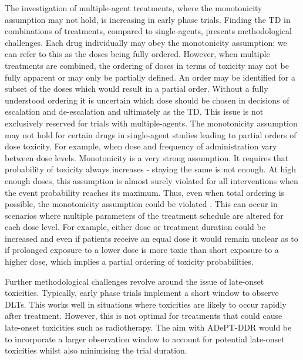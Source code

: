 The investigation of multiple-agent treatments, where the monotonicity assumption may not hold, is increasing in early phase trials. Finding the TD in combinations of treatments, compared to single-agents,  presents methodological challenges. Each drug individually may obey the monotonicity assumption; we can refer to this as the doses being fully ordered. However, when multiple treatments are combined, the ordering of doses in terms of toxicity may not be fully apparent or may only be partially defined. An order may be identified for a subset of the doses which would result in a partial order. Without a fully understood ordering it is uncertain which dose should be chosen in decisions of escalation and de-escalation and ultimately as the TD. This issue is not exclusively reserved for trials with multiple-agents. The monotonicity assumption may not hold for certain drugs in single-agent studies leading to partial orders of dose toxicity. For example, when dose and frequency of administration vary between dose levels. Monotonicity is a very strong assumption. It requires that probability of toxicity always increases - staying the same is not enough. At high enough doses, this assumption is almost surely violated for all interventions when the event probability reaches its maximum. Thus, even when total ordering is possible, the monotonicity assumption could be violated \cite{brockMoreBetterAnalysis2021}. This can occur in scenarios where multiple parameters of the treatment schedule are altered for each dose level. For example, either dose or treatment duration could be increased and even if patients receive an equal dose it would remain unclear as to if prolonged exposure to a lower dose is more toxic than short exposure to a higher dose, which implies a partial ordering of toxicity probabilities. 

Further methodological challenges revolve around the issue of late-onset toxicities. Typically, early phase trials implement a short window to observe DLTs. This works well in situations where toxicities are likely to occur rapidly after treatment. However, this is not optimal for treatments that could cause late-onset toxicities such as radiotherapy. The aim with ADePT-DDR would be to incorporate a larger observation window to account for potential late-onset toxicities whilst also minimising the trial duration. 

